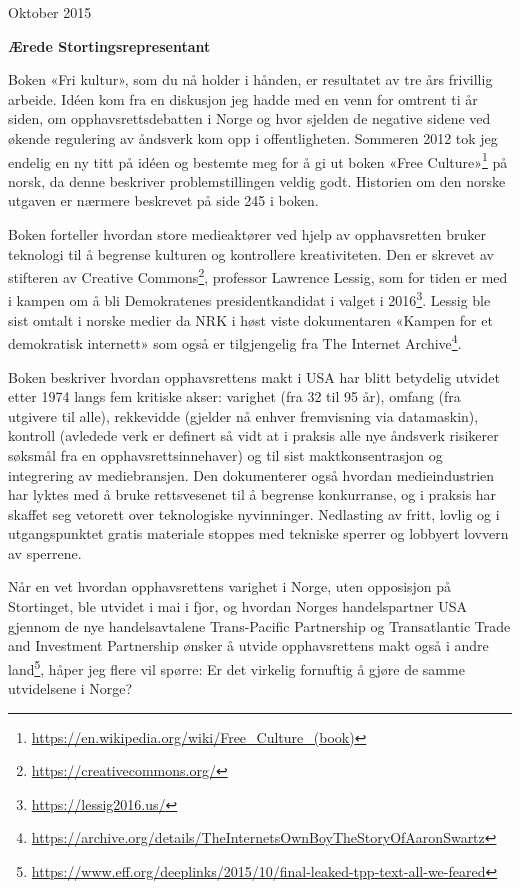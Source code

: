 \documentclass[a4paper, 11pt, norsk]{article}
\begin{document}
\begin{flushright} Oktober 2015 \end{flushright}

{\bf Ærede Stortingsrepresentant}

Boken «Fri kultur», som du nå holder i hånden, er resultatet av tre
års frivillig arbeide.  Idéen kom fra en diskusjon jeg hadde med en
venn for omtrent ti år siden, om opphavsrettsdebatten i Norge og hvor
sjelden de negative sidene ved økende regulering av åndsverk kom opp i
offentligheten.  Sommeren 2012 tok jeg endelig en ny titt på idéen og
bestemte meg for å gi ut boken «Free
  Culture»\footnote{\url{https://en.wikipedia.org/wiki/Free_Culture_(book)}}
på norsk, da denne beskriver problemstillingen veldig godt.  Historien
om den norske utgaven er nærmere beskrevet på side 245 i boken.

Boken forteller hvordan store medieaktører ved hjelp av opphavsretten
bruker teknologi til å begrense kulturen og kontrollere kreativiteten.
Den er skrevet av stifteren av Creative
Commons\footnote{\url{https://creativecommons.org/}}, professor
Lawrence Lessig, som for tiden er med i kampen om å bli Demokratenes
presidentkandidat i valget i
2016\footnote{\url{https://lessig2016.us/}}.  Lessig ble sist omtalt i
norske medier da NRK i høst viste dokumentaren «Kampen for et
  demokratisk internett» som også er tilgjengelig fra The Internet
Archive\footnote{\url{https://archive.org/details/TheInternetsOwnBoyTheStoryOfAaronSwartz}}.

Boken beskriver hvordan opphavsrettens makt i USA har blitt betydelig
utvidet etter 1974 langs fem kritiske akser: varighet (fra 32 til 95
år), omfang (fra utgivere til alle), rekkevidde (gjelder nå enhver
fremvisning via datamaskin), kontroll (avledede verk er definert så
vidt at i praksis alle nye åndsverk risikerer søksmål fra en
opphavsrettsinnehaver) og til sist maktkonsentrasjon og integrering av
mediebransjen.  Den dokumenterer også hvordan medieindustrien har
lyktes med å bruke rettsvesenet til å begrense konkurranse, og i
praksis har skaffet seg vetorett over teknologiske nyvinninger.
Nedlasting av fritt, lovlig og i utgangspunktet gratis materiale
stoppes med tekniske sperrer og lobbyert lovvern av sperrene.

Når en vet hvordan opphavsrettens varighet i Norge, uten opposisjon på
Stortinget, ble utvidet i mai i fjor, og hvordan Norges handelspartner
USA gjennom de nye handelsavtalene Trans-Pacific Partnership og
Transatlantic Trade and Investment Partnership ønsker å utvide
opphavsrettens makt også i andre
land\footnote{\url{https://www.eff.org/deeplinks/2015/10/final-leaked-tpp-text-all-we-feared}},
håper jeg flere vil spørre: Er det virkelig fornuftig å gjøre de samme
utvidelsene i Norge?
\end{document}
